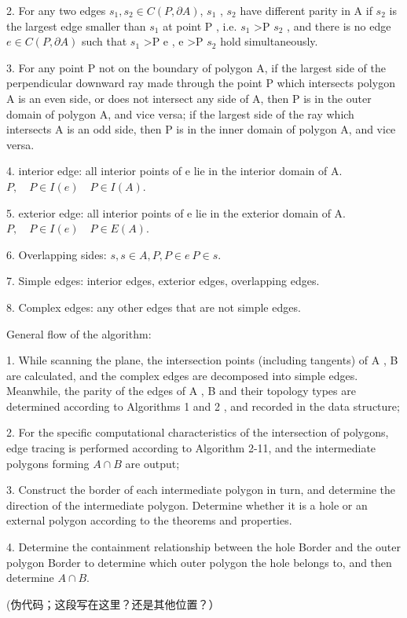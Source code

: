 2. For any two edges $s_{1}, s_{2}\in  C(P,\partial A)$, $s_{1}$ , $s_{2}$ have different parity in A if $s_{2}$ is the largest edge smaller than $s_{1}$ at point P , i.e. $s_{1}$ >P $s_{2}$ , and there is no edge $e\in  C(P,\partial A)$ such that $s_{1}$ >P e , e >P $s_{2}$ hold simultaneously.

3. For any point P not on the boundary of polygon A, if the largest side of the perpendicular downward ray made through the point P which intersects polygon A is an even side, or does not intersect any side of A, then P is in the outer domain of polygon A, and vice versa; if the largest side of the ray which intersects A is an odd side, then P is in the inner domain of polygon A, and vice versa.

4. interior edge: all interior points of e lie in the interior domain of A. $P , \quad P\in  I(e)\quad P \in  I (A)$.

5. exterior edge: all interior points of e lie in the exterior domain of A. $P , \quad P\in  I(e)\quad P \in  E (A)$.

6. Overlapping sides: $s , s \in  A , P , P \in  e \ P \in  s$.

7. Simple edges: interior edges, exterior edges, overlapping edges.

8. Complex edges: any other edges that are not simple edges.

General flow of the algorithm:

1. While scanning the plane, the intersection points (including tangents) of A , B are calculated, and the complex edges are decomposed into simple edges. Meanwhile, the parity of the edges of A , B and their topology types are determined according to Algorithms 1 and 2 , and recorded in the data structure;

2. For the specific computational characteristics of the intersection of polygons, edge tracing is performed according to Algorithm 2-11, and the intermediate polygons forming $A \cap  B$ are output;

3. Construct the border of each intermediate polygon in turn, and determine the direction of the intermediate polygon. Determine whether it is a hole or an external polygon according to the theorems and properties.

4. Determine the containment relationship between the hole Border and the outer polygon Border to determine which outer polygon the hole belongs to, and then determine $A \cap  B$.


(伪代码；这段写在这里？还是其他位置？）


